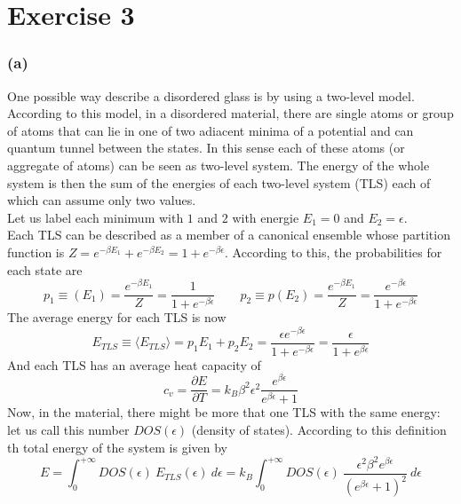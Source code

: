 \documentclass{article}
\begin{document}
\section*{Exercise 3}

\subsubsection*{(a)}
One possible way describe a disordered glass is by using a two-level model. According to this model, in a disordered material, there are single atoms or group of atoms that can lie in one of two adiacent minima of 
a potential and can quantum tunnel between the states. In this sense each of these atoms (or aggregate of atoms) can be seen as two-level system. The energy of the whole system is then the sum of the energies of each two-level system (TLS)
each of which can assume only two values. \\
Let us label each minimum with $1$ and $2$ with energie $E_1=0$ and $E_2=\epsilon$. \\
Each TLS can be described as a member of a canonical ensemble whose partition function is $Z = e^{-\beta E_1} + e^{-\beta E_2} = 1 + e^{-\beta \epsilon}$. According to this, the probabilities for each state are
\begin{equation*}
    p_1 \equiv (E_1) = \frac{e^{-\beta E_1}}{Z} = \frac{1}{1 + e^{-\beta \epsilon}} \qquad p_2 \equiv p(E_2) = \frac{e^{-\beta E_1}}{Z} = \frac{e^{-\beta \epsilon}}{1 + e^{-\beta \epsilon}}
\end{equation*}
The average energy for each TLS is now
\begin{equation*}
    E_{TLS} \equiv \langle E_{TLS} \rangle = p_1 E_1 + p_2 E_2 = \frac{\epsilon e^{-\beta\epsilon}}{1 + e^{-\beta\epsilon}} = \frac{\epsilon}{1 + e^{\beta\epsilon}}
\end{equation*}
And each TLS has an average heat capacity of
\begin{equation*}
    c_v = \frac{\partial E}{\partial T} = k_B \beta^2 \epsilon^2 \frac{e^{\beta \epsilon}}{e^{\beta \epsilon} + 1}
\end{equation*}
Now, in the material, there might be more that one TLS with the same energy: let us call this number $DOS(\epsilon)$ (density of states). According to this definition th total energy of the system is given by 
\begin{equation*}
    E = \int_0^{+\infty} DOS(\epsilon) \ E_{TLS}(\epsilon) \ d\epsilon = k_B \int_0^{+\infty} DOS(\epsilon) \ \frac{\epsilon^2\beta^2 e^{\beta\epsilon}}{(e^{\beta \epsilon}+1)^2} \ d\epsilon
\end{equation*}
\end{document}
